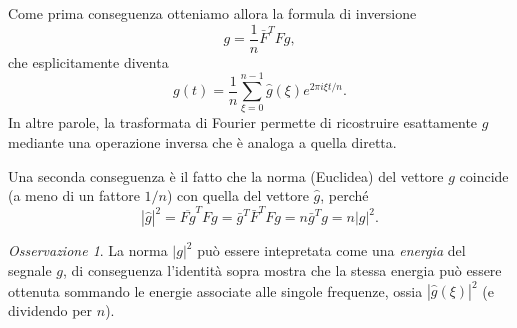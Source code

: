 \documentclass[
  italian,
  letterpaper,
]{book}
\theoremstyle{definition}
\theoremstyle{remark}
\newtheorem*{remark}{Osservazione}
\begin{document}
Come prima conseguenza otteniamo allora la formula di inversione
\[ g = \frac{1}{n} \bar{F}^T F g,\] che esplicitamente diventa
\[ g(t ) = \frac 1 n \sum_{\xi=0}^{n-1} \hat{g}(\xi) e^{2 \pi i \xi t/n}.\]
In altre parole, la trasformata di Fourier permette di ricostruire
esattamente \(g\) mediante una operazione inversa che è analoga a quella
diretta.

Una seconda conseguenza è il fatto che la norma (Euclidea) del vettore
\(g\) coincide (a meno di un fattore \(1/n\)) con quella del vettore
\(\hat{g}\), perché
\[ |\hat g|^2 = \overline{F g}^T F g = \bar g^T \bar{F}^T F g = n \bar{g}^T g =   n  |g|^2.\]

\begin{remark}
La norma \(|g|^2\) può essere intepretata come una \emph{energia} del
segnale \(g\), di conseguenza l'identità sopra mostra che la stessa
energia può essere ottenuta sommando le energie associate alle singole
frequenze, ossia \(|\hat{g}(\xi)|^2\) (e dividendo per \(n\)).
\end{remark}
\end{document}

